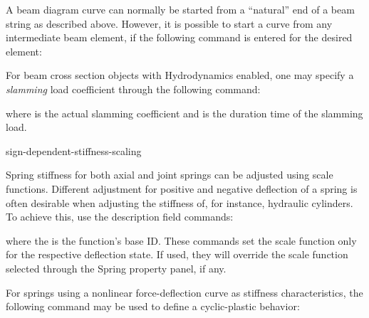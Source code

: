 
\noindent
A beam diagram curve can normally be started from a ``natural'' end of a beam
string as described above. However, it is possible to start a curve from any
intermediate beam element, if the following command is entered
for the desired element:




For beam cross section objects with Hydrodynamics enabled, one may specify a
{\sl slamming} load coefficient through the following command:


\noindent
where {\tt{}} is the actual slamming coefficient and
{\tt{}} is the duration time of the slamming load.



           {sign-dependent-stiffness-scaling}

Spring stiffness for both axial and joint springs can be adjusted using
scale functions. Different adjustment for positive and negative deflection of
a spring is often desirable when adjusting the stiffness of, for instance,
hydraulic cylinders. To achieve this, use the description field commands:

\medskip
{}

\medskip

\noindent
where the {\tt{}} is the function's base ID.
These commands set the scale function only for the respective deflection state.
If used, they will override the scale function selected through the Spring
property panel, if any.




For springs using a nonlinear force-deflection curve as stiffness
characteristics, the following command may be used to define a
cyclic-plastic behavior:

